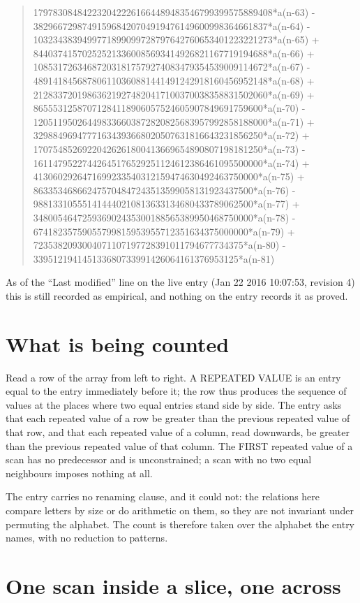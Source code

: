 \documentclass[11pt,a4paper]{article}
\theoremstyle{plain}
\theoremstyle{definition}
\begin{document}
\begin{quote}
1797830848422320422261664489483546799399575889408*a(n-63) - 382966729874915968420704919476149600998364661837*a(n-64) - 1032343839499771899099728797642760653401223221273*a(n-65) + 844037415702525213360085693414926821167719194688*a(n-66) + 108531726346872031817579274083479354539009114672*a(n-67) - 489141845687806110360881441491242918160456952148*a(n-68) + 212833720198636219274820417100370038358831502060*a(n-69) + 86555312587071284118906057524605907849691759600*a(n-70) - 120511950264498336603872820825683957992858188000*a(n-71) + 32988496947771634393668020507631816643231856250*a(n-72) + 17075485269220426261800413669654890807198181250*a(n-73) - 16114795227442645176529251124612386461095500000*a(n-74) + 4130602926471699233540312159474630492463750000*a(n-75) + 863353468662475704847243513599058131923437500*a(n-76) - 988133105551414440210813633134680433789062500*a(n-77) + 348005464725936902435300188565389950468750000*a(n-78) - 67418235759055799815953955712351634375000000*a(n-79) + 7235382093004071107197728391011794677734375*a(n-80) - 339512194145133680733991426064161376953125*a(n-81)
\end{quote}
As of the ``Last modified'' line on the live entry (Jan 22 2016 10:07:53, revision 4) this is still
recorded as empirical, and nothing on the entry records it as proved.

\section{What is being counted}

Read a row of the array from left to right. A REPEATED VALUE is an entry equal to the entry
immediately before it; the row thus produces the sequence of values at the places where two
equal entries stand side by side. The entry asks that each repeated value of a row be
greater than the previous repeated value of that row, and that each repeated value of a column,
read downwards, be greater than the previous repeated value of that column. The FIRST repeated
value of a scan has no predecessor and is unconstrained; a scan with no two equal neighbours
imposes nothing at all.

The entry carries no renaming clause, and it could not: the relations here compare letters by
size or do arithmetic on them, so they are not invariant under permuting the alphabet. The
count is therefore taken over the alphabet the entry names, with no reduction to patterns.

\section{One scan inside a slice, one across}
\end{document}
